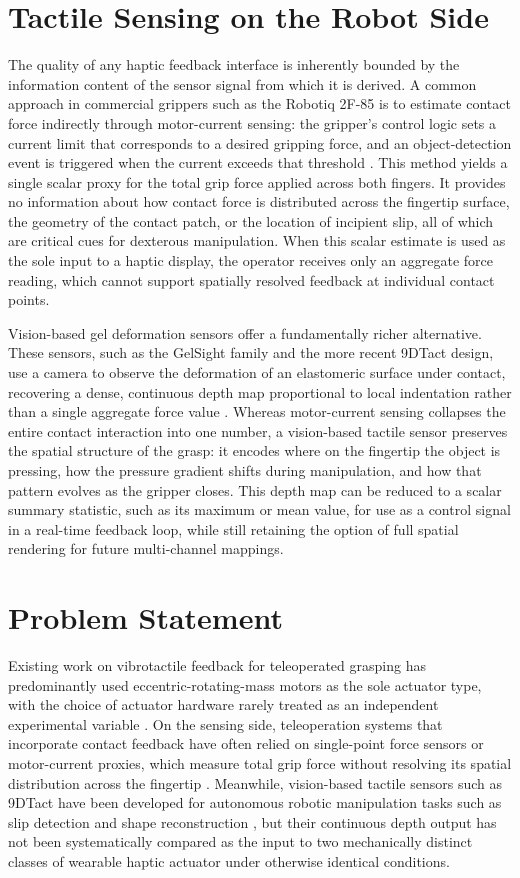 \documentclass[12pt, a4paper]{report}
\begin{document}
\section{Tactile Sensing on the Robot Side}
The quality of any haptic feedback interface is inherently bounded by the information content of the sensor signal from which it is derived. A common approach in commercial grippers such as the Robotiq 2F-85 is to estimate contact force indirectly through motor-current sensing: the gripper's control logic sets a current limit that corresponds to a desired gripping force, and an object-detection event is triggered when the current exceeds that threshold \cite{robotiq_manual}. This method yields a single scalar proxy for the total grip force applied across both fingers. It provides no information about how contact force is distributed across the fingertip surface, the geometry of the contact patch, or the location of incipient slip, all of which are critical cues for dexterous manipulation. When this scalar estimate is used as the sole input to a haptic display, the operator receives only an aggregate force reading, which cannot support spatially resolved feedback at individual contact points.

Vision-based gel deformation sensors offer a fundamentally richer alternative. These sensors, such as the GelSight family and the more recent 9DTact design, use a camera to observe the deformation of an elastomeric surface under contact, recovering a dense, continuous depth map proportional to local indentation rather than a single aggregate force value \cite{lin2023}. Whereas motor-current sensing collapses the entire contact interaction into one number, a vision-based tactile sensor preserves the spatial structure of the grasp: it encodes where on the fingertip the object is pressing, how the pressure gradient shifts during manipulation, and how that pattern evolves as the gripper closes. This depth map can be reduced to a scalar summary statistic, such as its maximum or mean value, for use as a control signal in a real-time feedback loop, while still retaining the option of full spatial rendering for future multi-channel mappings.

\section{Problem Statement}
Existing work on vibrotactile feedback for teleoperated grasping has predominantly used eccentric-rotating-mass motors as the sole actuator type, with the choice of actuator hardware rarely treated as an independent experimental variable \cite{pacchierotti2017}. On the sensing side, teleoperation systems that incorporate contact feedback have often relied on single-point force sensors or motor-current proxies, which measure total grip force without resolving its spatial distribution across the fingertip \cite{zheng2024}. Meanwhile, vision-based tactile sensors such as 9DTact have been developed for autonomous robotic manipulation tasks such as slip detection and shape reconstruction \cite{lin2023}, but their continuous depth output has not been systematically compared as the input to two mechanically distinct classes of wearable haptic actuator under otherwise identical conditions.
\end{document}
